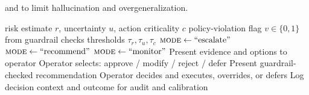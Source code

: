 \documentclass[journal]{IEEEtran}
\theoremstyle{plain}
\theoremstyle{definition}
\providecommand{\DIFaddtex}[1]{{\protect\color{blue} \sf #1}} %
\providecommand{\DIFaddbegin}{} %
\providecommand{\DIFaddend}{} %
\providecommand{\DIFdelend}{} %
\providecommand{\DIFadd}[1]{\texorpdfstring{\DIFaddtex{#1}}{#1}} %
\newcommand{\DIFaddincludegraphics}[2][]{{\color{blue}\fbox{\DIFOincludegraphics[#1]{#2}}}} %
\DeclareRobustCommand{\DIFaddbegin}{\DIFOaddbegin \let\includegraphics\DIFaddincludegraphics} %
\DeclareRobustCommand{\DIFaddend}{\DIFOaddend \let\includegraphics\DIFOincludegraphics} %
\DeclareRobustCommand{\DIFdelend}{\DIFOaddend \let\includegraphics\DIFOincludegraphics} %
\begin{document}
\DIFdelend \DIFaddbegin \DIFadd{and to limit hallucination and overgeneralization.
    }\begin{algorithm}[t]
        \caption{Uncertainty-aware escalation and human override policy}
        \label{alg:escalation}
        \begin{algorithmic}[1]
            \Require risk estimate $r$, uncertainty $u$, action criticality $c$
            \Require policy-violation flag $v \in \{0,1\}$ from guardrail checks
            \Require thresholds $\tau_r, \tau_u, \tau_c$
            \State $\textsc{mode} \leftarrow \text{``escalate''}$ 
            \State $\textsc{mode} \leftarrow \text{``recommend''}$ 
            \Else
            \State $\textsc{mode} \leftarrow \text{``monitor''}$
            \EndIf
            \State Present evidence and options to operator
            \State Operator selects: approve / modify / reject / defer
            \State Present guardrail-checked recommendation
            \State Operator decides and executes, overrides, or defers
            \EndIf
            \State Log decision context and outcome for audit and calibration
        \end{algorithmic}
    \end{algorithm}
\DIFaddend 
\end{document}
